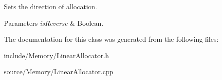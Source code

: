 Sets the direction of allocation. 


\begin{DoxyParams}{Parameters}
{\em is\+Reverse} & Boolean. \\
\hline
\end{DoxyParams}


The documentation for this class was generated from the following files\+:\begin{DoxyCompactItemize}
\item 
include/\+Memory/Linear\+Allocator.\+h\item 
source/\+Memory/Linear\+Allocator.\+cpp\end{DoxyCompactItemize}
